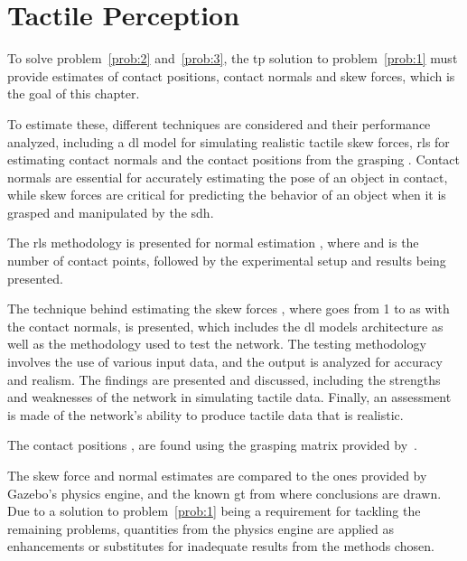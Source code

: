 \chapter{Tactile Perception}\label{ch:1-tactile-perception}


To solve problem~\ref{prob:2} and~\ref{prob:3}, the \gls{tp} solution to problem~\ref{prob:1} must provide estimates of contact positions, contact normals and skew forces, which is the goal of this chapter. \medskip

To estimate these, different techniques are considered and their performance analyzed, including a \gls{dl} model for simulating realistic tactile skew forces, \gls{rls} for estimating contact normals and the contact positions from the grasping . Contact normals are essential for accurately estimating the pose of an object in contact, while skew forces are critical for predicting the behavior of an object when it is grasped and manipulated by the \gls{sdh}. \medskip

The \gls{rls} methodology is presented for normal estimation , where  and  is the number of contact points, followed by the experimental setup and results being presented.\medskip

The technique behind estimating the skew forces , where  goes from \num{1} to  as with the contact normals, is presented, which includes the \gls{dl} models architecture as well as the methodology used to test the network. The testing methodology involves the use of various input data, and the output is analyzed for accuracy and realism. The findings are presented and discussed, including the strengths and weaknesses of the network in simulating tactile data. Finally, an assessment is made of the network's ability to produce tactile data that is realistic. \medskip

The contact positions , are found using the grasping matrix  provided by~\cite{simulation-of-the-syntouch-biotac-sensor}.\medskip

The skew force and normal estimates are compared to the ones provided by Gazebo's physics engine, and the known \gls{gt} from where conclusions are drawn. Due to a solution to problem~\ref{prob:1} being a requirement for tackling the remaining problems, quantities from the physics engine are applied as enhancements or substitutes for inadequate results from the methods chosen. \medskip

